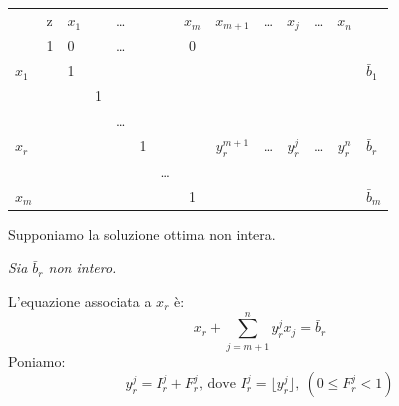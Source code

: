 \begin{table}[h]
	\centering
	\begin{tabular}{llllllcccccccc}
		&                       z & $x_{1}$ &    & \dots &     &      & $x_{m}$ & $x_{m+1}$     & \dots & $x_{j}$     & \dots & $x_{n}$     & \\ \cline{2-14}
		& \multicolumn{1}{|l|}{1} & 0       &    & \dots &     &      & 0       &               &     &             &     &             & \multicolumn{1}{|l|}{} \\ \cline{2-14}
		$x_{1}$ & \multicolumn{1}{|l|}{}  & 1       &    &     &     &      &         &               &     &             &     &	           & \multicolumn{1}{|l|}{$\bar{b}_{1}$} \\
		& \multicolumn{1}{|l|}{}  &         & 1  &     &     &      &         &               &     &             &     &             & \multicolumn{1}{|l|}{} \\
		& \multicolumn{1}{|l|}{}  &         &    & \dots &     &      &         &               &     &             &     &             & \multicolumn{1}{|l|}{} \\
		$x_{r}$ & \multicolumn{1}{|l|}{}  &         &    &     & 1   &      &         & $y_{r}^{m+1}$ & \dots & $y_{r}^{j}$ & \dots & $y_{r}^{n}$ & \multicolumn{1}{|l|}{$\bar{b}_{r}$} \\
		& \multicolumn{1}{|l|}{}  &         &    &     &     & \dots  &         &               &     &             &     &             & \multicolumn{1}{|l|}{} \\
		$x_{m}$ & \multicolumn{1}{|l|}{}  &         &    &     &     &      & 1       &               &     &             &     &             & \multicolumn{1}{|l|}{$\bar{b}_{m}$} \\ \cline{2-14}
	\end{tabular}
\end{table}

Supponiamo la soluzione ottima non intera.

\emph{Sia $\bar{b}_{r}$ non intero.}

L'equazione associata a $x_{r}$ è:
\begin{equation}\label{eq:2.1}
x_{r} + \sum_{j=m+1}^{n} y_{r}^{j} x_{j} = \bar{b}_{r}
\end{equation}
Poniamo:
\begin{equation*}
y_{r}^{j} = I_{r}^{j} + F_{r}^{j}\text{, dove }I_{r}^{j} = \lfloor y_{r}^{j} \rfloor,\ (0 \le F_{r}^{j} < 1)
\end{equation*}

